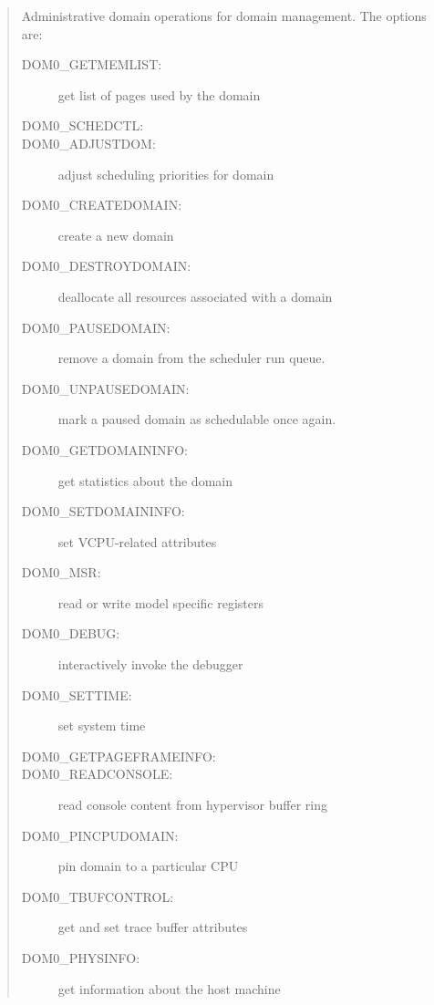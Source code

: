 \documentclass[11pt,twoside,final,openright]{report}
\newcommand{\hypercall}[1]{\vspace{2mm}{\sf #1}}
\begin{document}
\begin{quote}
\hypercall{dom0\_op(dom0\_op\_t *op)} 

Administrative domain operations for domain management. The options are:

\begin{description} 
\item [DOM0\_GETMEMLIST:] get list of pages used by the domain

\item [DOM0\_SCHEDCTL:]

\item [DOM0\_ADJUSTDOM:] adjust scheduling priorities for domain

\item [DOM0\_CREATEDOMAIN:] create a new domain

\item [DOM0\_DESTROYDOMAIN:] deallocate all resources associated
with a domain

\item [DOM0\_PAUSEDOMAIN:] remove a domain from the scheduler run 
queue. 

\item [DOM0\_UNPAUSEDOMAIN:] mark a paused domain as schedulable
  once again. 

\item [DOM0\_GETDOMAININFO:] get statistics about the domain

\item [DOM0\_SETDOMAININFO:] set VCPU-related attributes

\item [DOM0\_MSR:] read or write model specific registers

\item [DOM0\_DEBUG:] interactively invoke the debugger

\item [DOM0\_SETTIME:] set system time

\item [DOM0\_GETPAGEFRAMEINFO:] 

\item [DOM0\_READCONSOLE:] read console content from hypervisor buffer ring

\item [DOM0\_PINCPUDOMAIN:] pin domain to a particular CPU

\item [DOM0\_TBUFCONTROL:] get and set trace buffer attributes

\item [DOM0\_PHYSINFO:] get information about the host machine


\end{description}
\end{quote}
\end{document}
